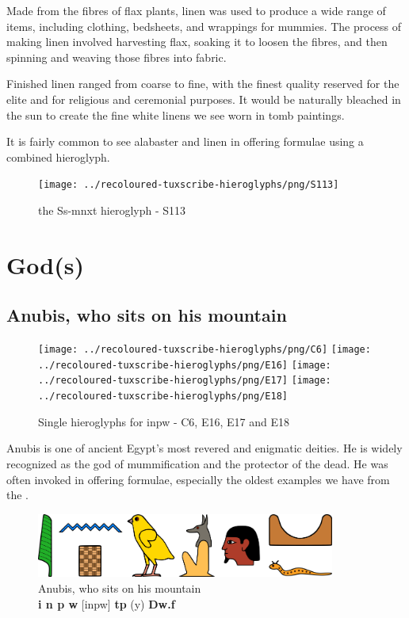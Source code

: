 Made from the fibres of flax plants, linen was used to produce a wide range of items, including clothing, bedsheets, and wrappings for mummies. The process of making linen involved harvesting flax, soaking it to loosen the fibres, and then spinning and weaving those fibres into fabric.

Finished linen ranged from coarse to fine, with the finest quality reserved for the elite and for religious and ceremonial purposes. It would be naturally bleached in the sun to create the fine white linens we see worn in tomb paintings.

It is fairly common to see alabaster and linen in offering formulae using a combined hieroglyph.

\begin{figure} [H]
	\centering
	\texttt{[image: ../recoloured-tuxscribe-hieroglyphs/png/S113]}
	\caption{the Ss-mnxt hieroglyph - S113}
\end{figure}

\section*{God(s)}

\subsection*{Anubis, who sits on his mountain}

\begin{figure} [H]
	\centering
	\texttt{[image: ../recoloured-tuxscribe-hieroglyphs/png/C6]}
	\hspace{0.03125\textwidth}
	\texttt{[image: ../recoloured-tuxscribe-hieroglyphs/png/E16]}
	\texttt{[image: ../recoloured-tuxscribe-hieroglyphs/png/E17]}
	\texttt{[image: ../recoloured-tuxscribe-hieroglyphs/png/E18]}
	\caption{Single hieroglyphs for inpw - C6, E16, E17 and E18}
\end{figure}

Anubis is one of ancient Egypt's most revered and enigmatic deities. He is widely recognized as the god of mummification and the protector of the dead. He was often invoked in offering formulae, especially the oldest examples we have from the .

\begin{figure} [H]
	\centering
	\includegraphics[width=0.875\textwidth]{../images/inpw-tpy-dwf}
	\caption{Anubis, who sits on his mountain\\\textbf{i n p w} [inpw] \textbf{tp} (y) \textbf{Dw.f}}
\end{figure}

